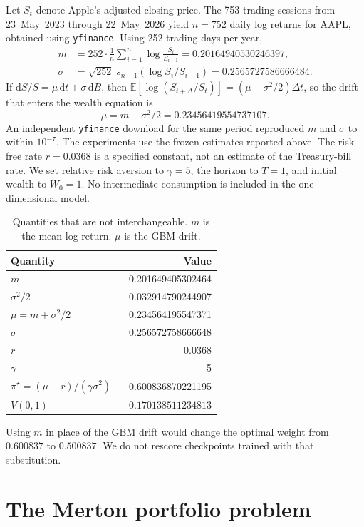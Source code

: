 \documentclass[11pt,a4paper]{article}
\newcommand{\E}{\mathbb{E}}
\begin{document}
Let $S_t$ denote Apple's adjusted closing price. The 753 trading sessions from 23~May~2023 through 22~May~2026 yield $n=752$ daily log returns for AAPL, obtained using \texttt{yfinance}. Using 252 trading days per year,
\begin{align}
m &= 252\cdot \frac{1}{n}\sum_{i=1}^{n}\log\frac{S_{i}}{S_{i-1}} = 0.20164940530246397,\\
\sigma &= \sqrt{252}\; s_{n-1}(\log S_{i}/S_{i-1}) = 0.2565727586666484.
\end{align}
If $\mathrm dS/S=\mu\,\mathrm dt+\sigma\,\mathrm dB$, then $\E[\log(S_{t+\Delta}/S_t)]=(\mu-\sigma^2/2)\Delta t$, so the drift that enters the wealth equation is
\begin{equation}
\mu = m+\sigma^2/2 = 0.23456419554737107.
\end{equation}
An independent \texttt{yfinance} download for the same period reproduced $m$ and $\sigma$ to within $10^{-7}$. The experiments use the frozen estimates reported above. The risk-free rate $r=0.0368$ is a specified constant, not an estimate of the Treasury-bill rate. We set relative risk aversion to $\gamma=5$, the horizon to $T=1$, and initial wealth to $W_0=1$. No intermediate consumption is included in the one-dimensional model.

\begin{table}[H]
\centering
\caption{Quantities that are not interchangeable. $m$ is the mean log return. $\mu$ is the GBM drift.}
\label{tab:market}
\begin{tabular}{lr}
\toprule
Quantity & Value \\
\midrule
$m$ & 0.201649405302464 \\
$\sigma^2/2$ & 0.032914790244907 \\
$\mu=m+\sigma^2/2$ & 0.234564195547371 \\
$\sigma$ & 0.256572758666648 \\
$r$ & 0.0368 \\
$\gamma$ & 5 \\
$\pi^{\star}=(\mu-r)/(\gamma\sigma^2)$ & 0.600836870221195 \\
$V(0,1)$ & $-0.170138511234813$ \\
\bottomrule
\end{tabular}
\end{table}

Using $m$ in place of the GBM drift would change the optimal weight from $0.600837$ to $0.500837$. We do not rescore checkpoints trained with that substitution.

\section{The Merton portfolio problem}
\label{sec:control}
\end{document}
